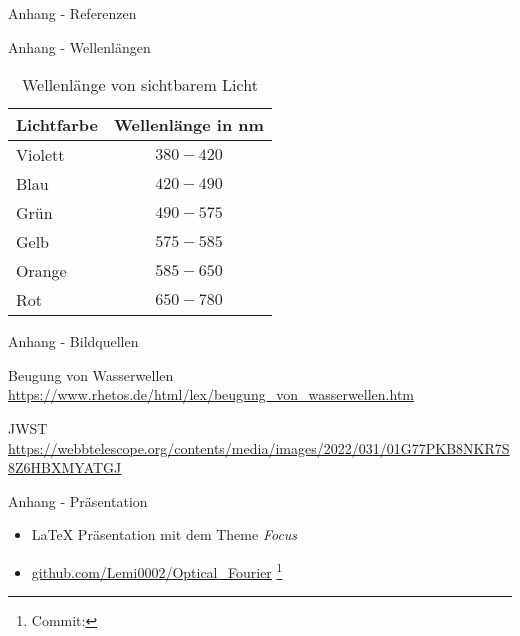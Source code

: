 \appendix

\begin{frame}{Anhang - Referenzen}
    \nocite{*} %
    
    
\end{frame}

\begin{frame}{Anhang - Wellenlängen}
    \begin{table}
        \centering %
        \begin{tabular}{l c}
            \toprule
            Lichtfarbe & Wellenlänge in nm \\
            \toprule
            Violett    & $380 - 420$       \\
            Blau       & $420 - 490$       \\
            Grün       & $490 - 575$       \\
            Gelb       & $575 - 585$       \\
            Orange     & $585 - 650$       \\
            Rot        & $650 - 780$       \\
            \bottomrule
        \end{tabular}
        \caption{Wellenlänge von sichtbarem Licht}
    \end{table}
\end{frame}

\begin{frame}{Anhang - Bildquellen}
    \begin{block}{Beugung von Wasserwellen}
        \url{https://www.rhetos.de/html/lex/beugung_von_wasserwellen.htm}
    \end{block}

    \begin{block}{JWST}
        \url{https://webbtelescope.org/contents/media/images/2022/031/01G77PKB8NKR7S8Z6HBXMYATGJ}
    \end{block}
\end{frame}

\begin{frame}{Anhang - Präsentation}
    \begin{itemize}
        \item \LaTeX{} Präsentation mit dem Theme \emph{Focus}
        \item \url{github.com/Lemi0002/Optical_Fourier} \footnote{Commit: }
    \end{itemize}
\end{frame}
